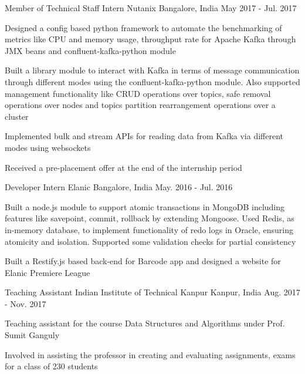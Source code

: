 \begin{cventries}
  \cventry
    {Member of Technical Staff Intern}
    {Nutanix}
    {Bangalore, India}
    {May 2017 - Jul. 2017}
    {
      \begin{cvitems}
        \item {Designed a config based python framework to automate the benchmarking of metrics like CPU and memory usage, throughput rate for Apache Kafka through JMX beans and confluent-kafka-python module}
        \item {Built a library module to interact with Kafka in terms of message communication through different modes using the confluent-kafka-python module. Also supported management functionality like CRUD operations over topics, safe removal operations over nodes and topics partition rearrangement operations over a cluster}
        \item {Implemented bulk and stream APIs for reading data from Kafka via different modes using websockets}
        \item {Received a pre-placement offer at the end of the internship period}
      \end{cvitems}
    }
  \cventry
    {Developer Intern}
    {Elanic}
    {Bangalore, India}
    {May. 2016 - Jul. 2016}
    {
      \begin{cvitems}
        \item {Built a node.js module to support atomic transactions in MongoDB including features like savepoint, commit, rollback by extending Mongoose. Used Redis, as in-memory database, to implement functionality of redo logs in Oracle, ensuring atomicity and isolation. Supported some validation checks for partial consistency}
        \item {Built a Restify.js based back-end for Barcode app and designed a website for Elanic Premiere League}
      \end{cvitems}
    }
  \cventry
    {Teaching Assistant}
    {Indian Institute of Technical Kanpur}
    {Kanpur, India}
    {Aug. 2017 - Nov. 2017}
    {
      \begin{cvitems}
        \item {Teaching assistant for the course Data Structures and Algorithms under Prof. Sumit Ganguly}
        \item {Involved in assisting the professor in creating and evaluating assignments, exams for a class of 230 students}
      \end{cvitems} 
    }
\end{cventries}
